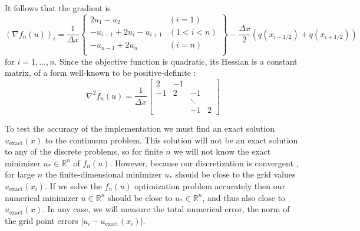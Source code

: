 \documentclass[11pt]{article}
\newcommand{\RR}{\mathbb{R}}
\newcommand{\grad}{\nabla}
\begin{document}
It follows that the gradient is
\begin{equation}
\left(\grad f_n(u)\right)_i = \frac{1}{\Delta x} \left\{\begin{matrix}
2 u_1 - u_2 & (i=1) \\
-u_{i-1} + 2 u_i - u_{i+1} & (1<i<n) \\
-u_{n-1} + 2 u_n & (i=n) \\
\end{matrix} \right\} - \frac{\Delta x}{2} (q(x_{i-1/2}) + q(x_{i+1/2}))
\end{equation}
for $i=1,\dots,n$.  Since the objective function is quadratic, its Hessian is a constant matrix, of a form well-known to be positive-definite \cite{LeVeque2007}:
\begin{equation}
\grad^2 f_n(u) = \frac{1}{\Delta x} \begin{bmatrix}
2  & -1 &    &    \\
-1 &  2 & -1 &    \\
   &    & \ddots &\\
   &    & -1 &  2
\end{bmatrix}
\end{equation}

\newcommand{\uex}{u_{\text{exact}}}
To test the accuracy of the implementation we must find an exact solution $\uex(x)$ to the continuum problem.  This solution will not be an exact solution to any of the discrete problems, so for finite $n$ we will not know the exact minimizer $u_* \in \RR^n$ of $f_n(u)$.  However, because our discretization is convergent \cite{Elmanetal2014,LeVeque2007}, for large $n$ the finite-dimensional minimizer $u_*$ should be close to the grid values $\uex(x_i)$.  If we solve the $f_n(u)$ optimization problem accurately then our numerical minimizer $u\in\RR^n$ should be close to $u_*\in\RR^n$, and thus also close to $\uex(x)$.  In any case, we will measure the total numerical error, the norm of the grid point errors $|u_i - \uex(x_i)|$.
\end{document}
